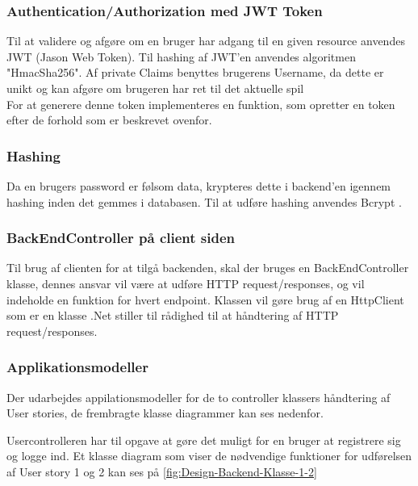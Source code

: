 \subsubsection{Authentication/Authorization med JWT Token}
Til at validere og afgøre om en bruger har adgang til en given resource anvendes JWT (Jason Web Token). Til hashing af JWT'en anvendes algoritmen "HmacSha256". Af private Claims benyttes brugerens Username, da dette er unikt og kan afgøre om brugeren har ret til det aktuelle spil\\

For at generere denne token implementeres en funktion, som opretter en token efter de forhold som er beskrevet ovenfor.\\


\subsubsection{Hashing}
\label{sssec: Hashing}
Da en brugers password er følsom data, krypteres dette i backend'en igennem hashing inden det gemmes i databasen. Til at udføre hashing anvendes Bcrypt \cite{Bcrypt}.


\subsubsection{BackEndController på client siden}
Til brug af clienten for at tilgå backenden, skal der bruges en BackEndController klasse, dennes ansvar vil være at udføre HTTP request/responses, og vil indeholde en funktion for hvert endpoint. Klassen vil gøre brug af en HttpClient som er en klasse .Net stiller til rådighed til at håndtering af HTTP request/responses.


\subsubsection{Applikationsmodeller}
Der udarbejdes appilationsmodeller for de to controller klassers håndtering af User stories, de frembragte klasse diagrammer kan ses nedenfor.

Usercontrolleren har til opgave at gøre det muligt for en bruger at registrere sig og logge ind. Et klasse diagram som viser de nødvendige funktioner for udførelsen af User story 1 og 2 kan ses på \autoref{fig:Design-Backend-Klasse-1-2}


